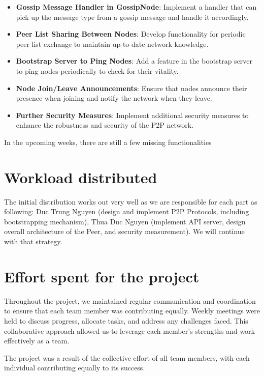 \begin{itemize}
    \item \textbf{Gossip Message Handler in GossipNode}: Implement a handler that can pick up the message type from a gossip message and handle it accordingly.
    \item \textbf{Peer List Sharing Between Nodes}: Develop functionality for periodic peer list exchange to maintain up-to-date network knowledge.
    \item \textbf{Bootstrap Server to Ping Nodes}: Add a feature in the bootstrap server to ping nodes periodically to check for their vitality.
    \item \textbf{Node Join/Leave Announcements}: Ensure that nodes announce their presence when joining and notify the network when they leave.
    \item \textbf{Further Security Measures}: Implement additional security measures to enhance the robustness and security of the P2P network.
\end{itemize}

In the upcoming weeks, there are still a few missing functionalities

\section{Workload distributed}

The initial distribution works out very well as we are responsible for each part as following: Duc Trung Nguyen (design and implement P2P Protocols, including bootstrapping mechanism), Thua Duc Nguyen (implement API server, design overall architecture of the Peer, and security measurement). We will continue with that strategy.


\section{Effort spent for the project}

Throughout the project, we maintained regular communication and coordination to ensure that each team member was contributing equally. Weekly meetings were held to discuss progress, allocate tasks, and address any challenges faced. This collaborative approach allowed us to leverage each member's strengths and work effectively as a team.

The project was a result of the collective effort of all team members, with each individual contributing equally to its success.